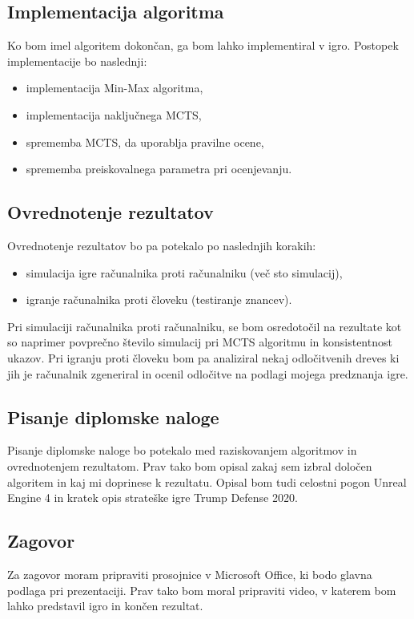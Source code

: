 \documentclass[11pt,a4paper]{article}
\begin{document}
\subsection{Implementacija algoritma}
Ko bom imel algoritem dokončan, ga bom lahko implementiral v igro.
Postopek implementacije bo naslednji:
\begin{itemize}
\item implementacija Min-Max algoritma,
\item implementacija naključnega MCTS,
\item sprememba MCTS, da uporablja pravilne ocene,
\item sprememba preiskovalnega parametra pri ocenjevanju.
\end{itemize}

\subsection{Ovrednotenje rezultatov}
Ovrednotenje rezultatov bo pa potekalo po naslednjih korakih:
\begin{itemize}
\item simulacija igre računalnika proti računalniku (več sto simulacij),
\item igranje računalnika proti človeku (testiranje znancev).
\end{itemize}
Pri simulaciji računalnika proti računalniku, se bom osredotočil na rezultate kot so naprimer povprečno število simulacij pri MCTS algoritmu in konsistentnost ukazov.
Pri igranju proti človeku bom pa analiziral nekaj odločitvenih dreves ki jih je računalnik zgeneriral in ocenil odločitve na podlagi mojega predznanja igre.

\subsection{Pisanje diplomske naloge}
Pisanje diplomske naloge bo potekalo med raziskovanjem algoritmov in ovrednotenjem rezultatom.
Prav tako bom opisal zakaj sem izbral določen algoritem in kaj mi doprinese k rezultatu.
Opisal bom tudi celostni pogon Unreal Engine 4 in kratek opis strateške igre Trump Defense 2020.
\subsection{Zagovor}
Za zagovor moram pripraviti prosojnice v Microsoft Office, ki bodo glavna podlaga pri prezentaciji.
Prav tako bom moral pripraviti video, v katerem bom lahko predstavil igro in končen rezultat.
\end{document}
